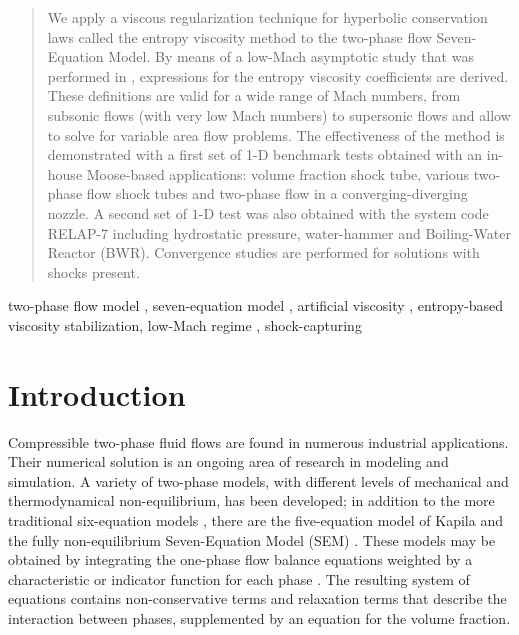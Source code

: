 \documentclass[preprint,10pt]{elsarticle}
\begin{document}
\begin{frontmatter}
\begin{abstract}
We apply a viscous regularization technique for hyperbolic 
conservation laws called the entropy viscosity method to the two-phase flow Seven-Equation Model. By means of a low-Mach asymptotic study that was performed in \cite{Marco_paper_sem}, expressions for the entropy viscosity coefficients are derived.
These definitions are valid for a wide range of Mach numbers, from subsonic flows (with very low Mach numbers) to 
supersonic flows and allow to solve for variable area flow problems.
%
The effectiveness of the method is demonstrated with a first set of 1-D benchmark tests obtained with an in-house Moose-based applications: volume fraction shock tube, various two-phase flow shock tubes and two-phase flow in a converging-diverging nozzle. A second set of $1$-D test was also obtained with the system code RELAP-7 including hydrostatic pressure, water-hammer and Boiling-Water Reactor (BWR). Convergence studies are performed for solutions with shocks present. 
\end{abstract}
\begin{keyword}
  two-phase flow model \sep 
	seven-equation model \sep
	artificial viscosity \sep 
	entropy-based viscosity stabilization\sep 
	low-Mach regime \sep 
	shock-capturing
\end{keyword}
\end{frontmatter}
\linenumbers


\section{Introduction}\label{sec:intro}
Compressible two-phase fluid flows are found in numerous industrial applications. Their numerical solution is an ongoing area of research 
in modeling and simulation. 
A variety of two-phase models, with different levels of mechanical and thermodynamical non-equilibrium, has been developed;
in addition to the more traditional six-equation models \cite{Stadtke}, there are the five-equation model of Kapila \cite{Kapila_2001,GuillardMurrone2003,Saurel_2009} 
and the fully non-equilibrium Seven-Equation Model (SEM) \cite{Berry_1985,BaerNunziato,Saurel_2001b,SEM}.  These models may be obtained
by integrating the one-phase flow balance equations weighted by a characteristic or indicator function for each phase \cite{DrewPassman}.
The resulting system of equations contains non-conservative terms and relaxation terms that 
describe the interaction between phases, supplemented by an equation for the volume fraction. 
\end{document}

